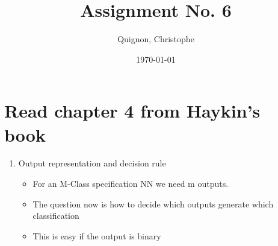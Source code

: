\documentclass{scrartcl}
\begin{document}
\title{Assignment No. 6}
\subtitle{}
\author{
  Quignon, Christophe \\
} 
\date{\today}


\maketitle

\section{Read chapter 4 from Haykin's book
}
\begin{enumerate}
\addtocounter{enumi}{6}
\item Output representation and decision rule
	\begin{itemize}
	\item For an M-Class specification NN we need m outputs.
	\item The question now is how to decide which outputs generate which classification
	\item This is easy if the output is binary
	\end{itemize}


\end{enumerate}
\end{document}
